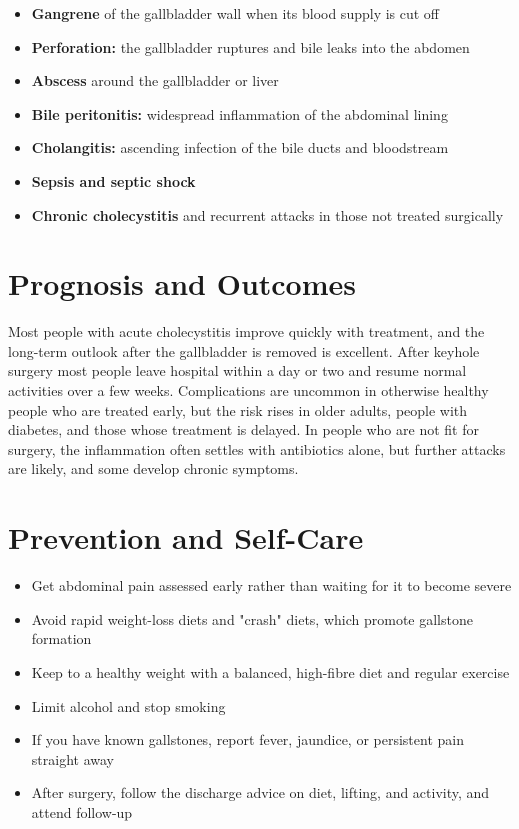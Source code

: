 \begin{itemize}
    \item \textbf{Gangrene} of the gallbladder wall when its blood supply is cut off
    \item \textbf{Perforation:} the gallbladder ruptures and bile leaks into the abdomen
    \item \textbf{Abscess} around the gallbladder or liver
    \item \textbf{Bile peritonitis:} widespread inflammation of the abdominal lining
    \item \textbf{Cholangitis:} ascending infection of the bile ducts and bloodstream
    \item \textbf{Sepsis and septic shock}
    \item \textbf{Chronic cholecystitis} and recurrent attacks in those not treated surgically
\end{itemize}

\section*{Prognosis and Outcomes}
Most people with acute cholecystitis improve quickly with treatment, and the long-term outlook after the gallbladder is removed is excellent. After keyhole surgery most people leave hospital within a day or two and resume normal activities over a few weeks. Complications are uncommon in otherwise healthy people who are treated early, but the risk rises in older adults, people with diabetes, and those whose treatment is delayed. In people who are not fit for surgery, the inflammation often settles with antibiotics alone, but further attacks are likely, and some develop chronic symptoms.

\section*{Prevention and Self-Care}
\begin{itemize}
    \item Get abdominal pain assessed early rather than waiting for it to become severe
    \item Avoid rapid weight-loss diets and "crash" diets, which promote gallstone formation
    \item Keep to a healthy weight with a balanced, high-fibre diet and regular exercise
    \item Limit alcohol and stop smoking
    \item If you have known gallstones, report fever, jaundice, or persistent pain straight away
    \item After surgery, follow the discharge advice on diet, lifting, and activity, and attend follow-up
\end{itemize}
